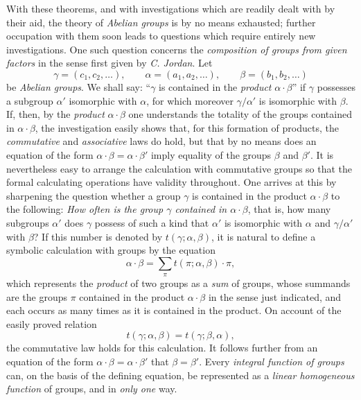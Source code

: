 \documentclass[11pt,a4paper]{article}
\begin{document}
With these theorems, and with investigations which are readily dealt with by their aid, the theory of \emph{Abelian groups} is by no means exhausted; further occupation with them soon leads to questions which require entirely new investigations. One such question concerns the \emph{composition of groups from given factors} in the sense first given by \emph{C. Jordan}. Let
\[
 \gamma=(c_1,c_2,\ldots),\qquad
 \alpha=(a_1,a_2,\ldots),\qquad
 \beta=(b_1,b_2,\ldots)
\]
be \emph{Abelian groups}. We shall say: ``$\gamma$ is contained in the \emph{product} $\alpha\cdot\beta$'' if $\gamma$ possesses a subgroup $\alpha'$ isomorphic with $\alpha$, for which moreover $\gamma/\alpha'$ is isomorphic with $\beta$. If, then, by the \emph{product} $\alpha\cdot\beta$ one understands the totality of the groups contained in $\alpha\cdot\beta$, the investigation easily shows that, for this formation of products, the \emph{commutative} and \emph{associative} laws do hold, but that by no means does an equation of the form $\alpha\cdot\beta=\alpha\cdot\beta'$ imply equality of the groups $\beta$ and $\beta'$. It is nevertheless easy to arrange the calculation with commutative groups so that the formal calculating operations have validity throughout. One arrives at this by sharpening the question whether a group $\gamma$ is contained in the product $\alpha\cdot\beta$ to the following: \emph{How often is the group $\gamma$ contained in $\alpha\cdot\beta$}, that is, how many subgroups $\alpha'$ does $\gamma$ possess of such a kind that $\alpha'$ is isomorphic with $\alpha$ and $\gamma/\alpha'$ with $\beta$? If this number is denoted by $t(\gamma;\alpha,\beta)$, it is natural to define a symbolic calculation with groups by the equation
\[
 \alpha\cdot\beta=\sum_{\pi} t(\pi;\alpha,\beta)\cdot\pi,
\]
which represents the \emph{product} of two groups as a \emph{sum} of groups, whose summands are the groups $\pi$ contained in the product $\alpha\cdot\beta$ in the sense just indicated, and each occurs as many times as it is contained in the product. On account of the easily proved relation
\[
 t(\gamma;\alpha,\beta)=t(\gamma;\beta,\alpha),
\]
the commutative law holds for this calculation. It follows further from an equation of the form $\alpha\cdot\beta=\alpha\cdot\beta'$ that $\beta=\beta'$. Every \emph{integral function of groups} can, on the basis of the defining equation, be represented as a \emph{linear homogeneous function} of groups, and in \emph{only one} way.
\end{document}
